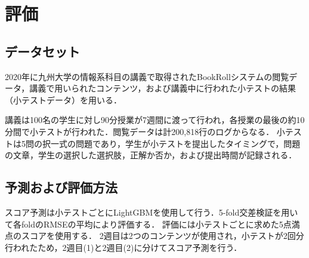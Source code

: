 \documentclass[platex,dvipdfmx,a4paper,twocolumn,base=10pt,jbase=10pt,ja=standard]{bxjsarticle}
\begin{document}






\section{評価}
\label{sec:evaluation}

\subsection{データセット}

2020年に九州大学の情報系科目の講義で取得されたBookRollシステムの閲覧データ，講義で用いられたコンテンツ，および講義中に行われた小テストの結果（小テストデータ）を用いる．

講義は100名の学生に対し90分授業が7週間に渡って行われ，各授業の最後の約10分間で小テストが行われた．閲覧データは計200,818行のログからなる．
%
小テストは5問の択一式の問題であり，学生が小テストを提出したタイミングで，問題の文章，学生の選択した選択肢，正解か否か，および提出時間が記録される．



\subsection{予測および評価方法}

スコア予測は小テストごとにLightGBMを使用して行う．5-fold交差検証を用いて各foldのRMSEの平均により評価する．
評価には小テストごとに求めた5点満点のスコアを使用する．
2週目は2つのコンテンツが使用され，小テストが2回分行われたため，2週目(1)と2週目(2)に分けてスコア予測を行う．
\end{document}
